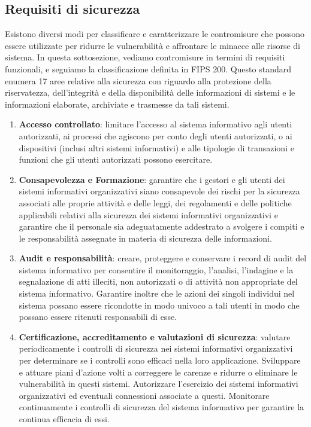 \subsection{Requisiti di sicurezza} 
Esistono diversi modi per classificare e caratterizzare le contromisure che possono essere utilizzate per ridurre le vulnerabilità e affrontare le minacce alle risorse di sistema. In questa sottosezione, vediamo contromisure in termini di requisiti funzionali, e seguiamo la classificazione definita in FIPS 200. Questo standard enumera 17 aree relative alla sicurezza con riguardo alla protezione della riservatezza, dell'integrità e della disponibilità delle informazioni di sistemi e le informazioni elaborate, archiviate e trasmesse da tali sistemi.
\begin{enumerate}
    \item \textbf{Accesso controllato}: limitare l'accesso al sistema informativo agli utenti autorizzati, ai processi che agiscono per conto degli utenti autorizzati, o ai dispositivi (inclusi altri sistemi informativi) e alle tipologie di transazioni e funzioni che gli utenti autorizzati possono esercitare.
    \item \textbf{Consapevolezza e Formazione}: garantire che i gestori e gli utenti dei sistemi informativi organizzativi siano consapevole dei rischi per la sicurezza associati alle proprie attività e delle leggi, dei regolamenti e delle politiche applicabili relativi alla sicurezza dei sistemi informativi organizzativi e  garantire che il personale sia adeguatamente addestrato a svolgere i compiti e le responsabilità assegnate in materia di sicurezza delle informazioni.
    \item \textbf{Audit e responsabilità}: creare, proteggere e conservare i record di audit del sistema informativo per consentire il monitoraggio, l'analisi, l'indagine e la segnalazione di atti illeciti, non autorizzati o di attività non appropriate del sistema informativo. Garantire inoltre che le azioni dei singoli individui  nel sistema possano essere ricondotte in modo univoco a tali utenti in modo che possano essere ritenuti responsabili di esse.
    \item \textbf{Certificazione, accreditamento e valutazioni di sicurezza}: valutare periodicamente i controlli di sicurezza nei sistemi informativi organizzativi per determinare se i controlli sono efficaci nella loro applicazione. Sviluppare e attuare piani d'azione volti a correggere le carenze e ridurre o eliminare le vulnerabilità in questi sistemi. Autorizzare l'esercizio dei sistemi informativi organizzativi ed eventuali connessioni associate a questi. Monitorare continuamente i controlli di sicurezza del sistema informativo  per garantire la continua efficacia di essi.

\end{enumerate}
